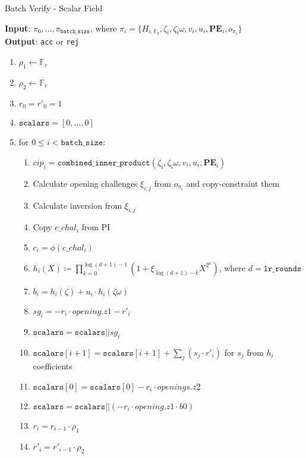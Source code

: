 \begin{algorithm}[H]
    \caption{Batch Verify - Scalar Field}
    \textbf{Input}: $\pi_0, \dots, \pi_{\texttt{batch\_size}}$, where $\pi_i = \{H_{i, \mathbb{F}_q}, \zeta_i, \zeta_i\omega, v_i, u_i,
    \textbf{PE}_i, o_{\pi_i} \}$ \\
    \textbf{Output}: \texttt{acc} or \texttt{rej}
    \begin{enumerate}
        \item $\rho_1 \leftarrow \mathbb{F}_r$
        \item $\rho_2 \leftarrow \mathbb{F}_r$
        \item $r_0 = r'_0 = 1$
        \item $\texttt{scalars} = [0, \dots, 0]$
        \item for $0 \leq i < \texttt{batch\_size}$:
        \begin{enumerate}
            \item $cip_i = \texttt{combined\_inner\_product}(\zeta_i, \zeta_i\omega, v_i, u_i, \textbf{PE}_i)$
            \item Calculate opening challenges $\xi_{i, j}$ from $o_{\pi_i}$ and copy-constraint them
            \item Calculate inversion from $\xi_{i, j}$
	   \item Copy $c\_chal_i$ from PI
            \item $c_i = \phi(c\_chal_i)$
            \item $h_i(X) \coloneqq \prod_{k=0}^{\log(d+1) - 1}(1 + \xi_{\log(d+1)-k}X^{2^k})$, where $d = \texttt{lr\_rounds}$
            \item $b_i = h_i(\zeta) + u_i \cdot h_i(\zeta\omega)$
            \item $sg_i = -r_i \cdot opening.z1 - r'_i$
	   \item $\texttt{scalars} = \texttt{scalars} || sg_i$
	   \item $\texttt{scalars}[i + 1] = \texttt{scalars}[i + 1] + \sum_j(s_j \cdot r'_i)$ for $s_j$ from $h_i$ coefficients
	   \item $\texttt{scalars}[0] = \texttt{scalars}[0] - r_i \cdot openings.z2$
	   \item $\texttt{scalars} = \texttt{scalars} || (-r_i \cdot opening.z1 \cdot b0)$
            \item $r_i = r_{i - 1} \cdot \rho_1$
            \item $r'_i = r'_{i - 1} \cdot \rho_2$
        \end{enumerate}
    \end{enumerate}
\end{algorithm}

